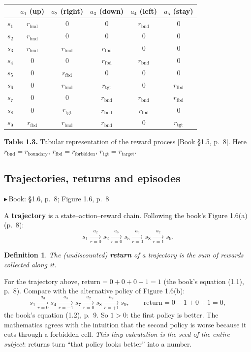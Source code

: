 \documentclass[11pt, letterpaper]{article}
\theoremstyle{runin}
\newtheorem*{definition}{Definition}
\theoremstyle{runinplain}
\theoremstyle{remark}
\newcommand{\bk}[1]{{\color{bookblue}\small$\blacktriangleright$\,\textsf{Book: #1}}}
\newcommand{\bkin}[1]{{\color{bookblue}\small[\textsf{Book #1}]}}
\begin{document}
\begin{table}[htbp]\centering\footnotesize
\setlength{\tabcolsep}{4pt}
\begin{tabular}{@{}l|ccccc@{}}
\toprule
 & $a_1$ (up) & $a_2$ (right) & $a_3$ (down) & $a_4$ (left) & $a_5$ (stay)\\
\midrule
$s_1$ & $r_{\text{bnd}}$ & 0 & 0 & $r_{\text{bnd}}$ & 0\\
$s_2$ & $r_{\text{bnd}}$ & 0 & 0 & 0 & 0\\
$s_3$ & $r_{\text{bnd}}$ & $r_{\text{bnd}}$ & $r_{\text{fbd}}$ & 0 & 0\\
$s_4$ & 0 & 0 & $r_{\text{fbd}}$ & $r_{\text{bnd}}$ & 0\\
$s_5$ & 0 & $r_{\text{fbd}}$ & 0 & 0 & 0\\
$s_6$ & 0 & $r_{\text{bnd}}$ & $r_{\text{tgt}}$ & 0 & $r_{\text{fbd}}$\\
$s_7$ & 0 & 0 & $r_{\text{bnd}}$ & $r_{\text{bnd}}$ & $r_{\text{fbd}}$\\
$s_8$ & 0 & $r_{\text{tgt}}$ & $r_{\text{bnd}}$ & $r_{\text{fbd}}$ & 0\\
$s_9$ & $r_{\text{fbd}}$ & $r_{\text{bnd}}$ & $r_{\text{bnd}}$ & 0 & $r_{\text{tgt}}$\\
\bottomrule
\end{tabular}\par\smallskip
{\footnotesize\textbf{Table 1.3.} Tabular representation of the reward process \bkin{\S1.5, p.~8}. Here
$r_{\text{bnd}}=r_{\text{boundary}}$, $r_{\text{fbd}}=r_{\text{forbidden}}$,
$r_{\text{tgt}}=r_{\text{target}}$.}
\end{table}


\subsection{Trajectories, returns and episodes}

\bk{\S1.6, p.~8; Figure 1.6, p.~8}

A \textbf{trajectory} is a state--action--reward chain. Following the book's
Figure 1.6(a) (p.~8):
\[
  s_1 \xrightarrow[r=0]{a_2} s_2 \xrightarrow[r=0]{a_3} s_5
      \xrightarrow[r=0]{a_3} s_8 \xrightarrow[r=1]{a_2} s_9 .
\]

\begin{definition}
The (undiscounted) \textbf{return} of a trajectory is the sum of rewards collected
along it.
\end{definition}

For the trajectory above, $\text{return}=0+0+0+1=1$ (the book's equation (1.1),
p.~8). Compare with the alternative policy of Figure 1.6(b):
\[
  s_1 \xrightarrow[r=0]{a_3} s_4 \xrightarrow[r=-1]{a_3} s_7
      \xrightarrow[r=0]{a_2} s_8 \xrightarrow[r=+1]{a_2} s_9,
  \qquad \text{return}=0-1+0+1=0,
\]
the book's equation (1.2), p.~9. So $1>0$: the first policy is better. The
mathematics agrees with the intuition that the second policy is worse because it
cuts through a forbidden cell. \emph{This tiny calculation is the seed of the
entire subject}: returns turn ``that policy looks better'' into a number.
\end{document}
